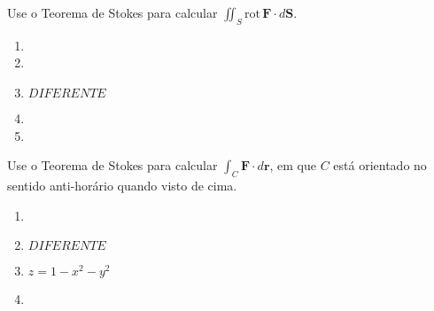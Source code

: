 



	
	
	\vspace{5mm}
	
	Use o Teorema de Stokes para calcular $\displaystyle \iint_S \mathrm{rot} \, \textbf{F} \cdot d\textbf{S}$.
	
	\begin{enumerate}
		
		\item
		\resposta{}

		\item
		\resposta{}

		\item $DIFERENTE$

		\item
		\resposta{}

		\item
		\resposta{}

	\end{enumerate}
	
	\vspace{5mm}
	
	Use o Teorema de Stokes para calcular $\displaystyle \int_C \textbf{F} \cdot d\textbf{r}$, em que $C$ está orientado no sentido anti-horário quando visto de cima.
	
	\begin{enumerate}[resume]
	
		\item
		\resposta{}

		\item $DIFERENTE$

		\item $z = 1 - x^2 - y^2$
		\resposta{}

		\item
		\resposta{}
	
	\end{enumerate}
		
	\vspace{5mm}	
	
	



